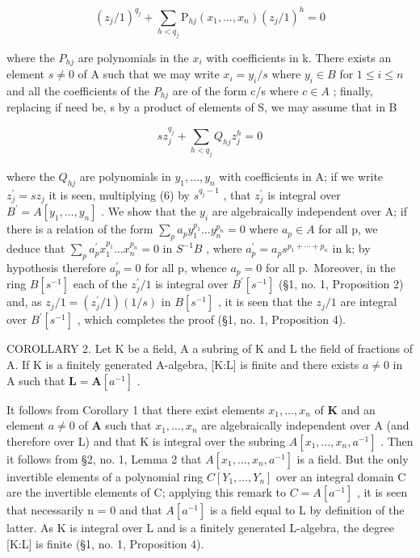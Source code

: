 \[
(z _ {j} / 1) ^ {q _ {j}} + \sum_ {h <   q _ {j}} \mathrm{P} _ {h j} (x _ {1}, \dots , x _ {n}) (z _ {j} / 1) ^ {h} = 0\tag{5}
\]

where the \(P_{hj}\) are polynomials in the \(x_{i}\) with coefficients in k. There exists an element \(s \neq 0\) of A such that we may write \(x_{i} = y_{i}/s\) where \(y_{i} \in B\) for \(1 \leqslant i \leqslant n\) and all the coefficients of the \(P_{hj}\) are of the form c/s where \(c \in A\) ; finally, replacing if need be, s by a product of elements of S, we may assume that in B

\[
s z _ {j} ^ {q _ {j}} + \sum_ {h <   q _ {j}} Q _ {h j} z _ {j} ^ {h} = 0\tag{6}
\]

where the \(Q_{hj}\) are polynomials in \(y_{1},\ldots,y_{n}\) with coefficients in A; if we write \(z_{j}^{\prime}=sz_{j}\) it is seen, multiplying (6) by \(s^{q_{j}-1}\) , that \(z_{j}^{\prime}\) is integral over \(B^{\prime}=A[y_{1},\ldots,y_{n}]\) . We show that the \(y_{i}\) are algebraically independent over A; if there is a relation of the form \(\sum_{p}a_{p}y_{1}^{p_{1}}\ldots y_{n}^{p_{n}}=0\) where \(a_{p}\in A\) for all p, we deduce that \(\sum_{p}a_{p}^{\prime}x_{1}^{p_{1}}\ldots x_{n}^{p_{n}}=0\) in \(S^{-1}B\) , where \(a_{p}^{\prime}=a_{p}s^{p_{1}+\cdots+p_{n}}\) in k; by hypothesis therefore \(a_{p}^{\prime}=0\) for all p, whence \(a_{p}=0\) for all p.~Moreover, in the ring \(B[s^{-1}]\) each of the \(z_{j}^{\prime}/1\) is integral over \(B^{\prime}[s^{-1}]\) (§1, no. 1, Proposition 2) and, as \(z_{j}/1=(z_{j}^{\prime}/1)(1/s)\) in \(B[s^{-1}]\) , it is seen that the \(z_{j}/1\) are integral over \(B^{\prime}[s^{-1}]\) , which completes the proof (§1, no. 1, Proposition 4).

COROLLARY 2. Let K be a field, A a subring of K and L the field of fractions of A. If K is a finitely generated A-algebra, {[}K:L{]} is finite and there exists \(a \neq 0\) in A such that \(\mathbf{L} = \mathbf{A}[a^{-1}]\) .

It follows from Corollary 1 that there exist elements \(x_{1}, \ldots, x_{n}\) of \(\mathbf{K}\) and an element \(a \neq 0\) of \(\mathbf{A}\) such that \(x_{1}, \ldots, x_{n}\) are algebraically independent over A (and therefore over L) and that K is integral over the subring \(A[x_{1},\ldots,x_{n},a^{-1}]\) . Then it follows from §2, no. 1, Lemma 2 that \(A[x_{1},\ldots,x_{n},a^{-1}]\) is a field. But the only invertible elements of a polynomial ring \(C[Y_{1},\ldots,Y_{n}]\) over an integral domain C are the invertible elements of C; applying this remark to \(C = A[a^{-1}]\) , it is seen that necessarily n = 0 and that \(A[a^{-1}]\) is a field equal to L by definition of the latter. As K is integral over L and is a finitely generated L-algebra, the degree {[}K:L{]} is finite (§1, no. 1, Proposition 4).

